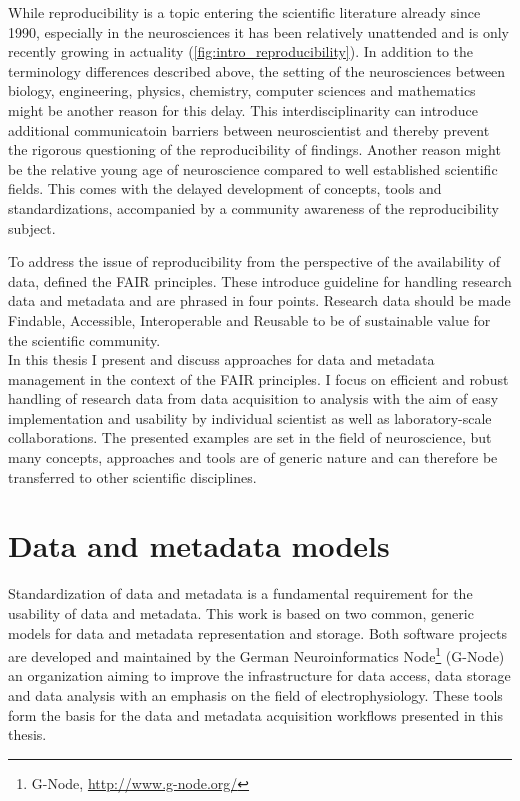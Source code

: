 While reproducibility is a topic entering the scientific literature already since 1990, especially in the neurosciences it has been relatively unattended and is only recently growing in actuality (\cref{fig:intro_reproducibility}). In addition to the terminology differences described above, the setting of the neurosciences between biology, engineering, physics, chemistry, computer sciences and mathematics might be another reason for this delay. This interdisciplinarity can introduce additional communicatoin barriers between neuroscientist and thereby prevent the rigorous questioning of the reproducibility of findings. Another reason might be the relative young age of neuroscience compared to well established scientific fields. This comes with the delayed development of concepts, tools and standardizations, accompanied by a community awareness of the reproducibility subject.

To address the issue of reproducibility from the perspective of the availability of data, \citet{Wilkinson_2016} defined the FAIR principles. These introduce guideline for handling research data and metadata and are phrased in four points. Research data should be made Findable, Accessible, Interoperable and Reusable to be of sustainable value for the scientific community.\\

In this thesis I present and discuss approaches for data and metadata management in the context of the FAIR principles. I focus on efficient and robust handling of research data from data acquisition to analysis with the aim of easy implementation and usability by individual scientist as well as laboratory-scale collaborations. The presented examples are set in the field of neuroscience, but many concepts, approaches and tools are of generic nature and can therefore be transferred to other scientific disciplines. 



\section{Data and metadata models}
Standardization of data and metadata is a fundamental requirement for the usability of data and metadata. This work is based on two common, generic models for data and metadata representation and storage. Both software projects are developed and maintained by the German Neuroinformatics Node\footnote{G-Node, \url{http://www.g-node.org/}} (G-Node) an organization aiming to improve the infrastructure for data access, data storage and data analysis with an emphasis on the field of electrophysiology. These tools form the basis for the data and metadata acquisition workflows presented in this thesis.


